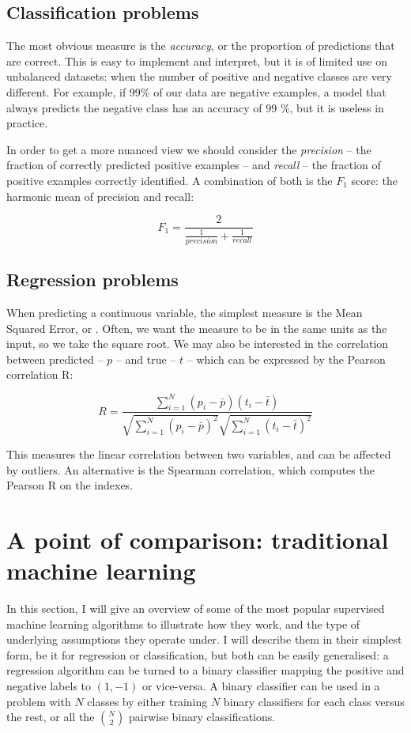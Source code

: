 \subsection{Classification problems}
The most obvious measure is the \emph{accuracy}, or the proportion of predictions that are correct.
This is easy to implement and interpret, but it is of limited use on unbalanced datasets: when the number of positive and negative classes are very different.
For example, if 99\% of our data are negative examples, a model that always predicts the negative class has an accuracy of 99 \%, but it is useless in practice.

In order to get  a more nuanced view we should consider the \emph{precision} -- the fraction of correctly predicted positive examples -- and \emph{recall} -- the fraction of positive examples correctly identified.
A combination  of both is the $F_1$ score: the harmonic mean of precision and recall:

\begin{equation*}
F_1 = \frac{2}{\frac{1}{precision} + \frac{1}{recall}}
\end{equation*}

\subsection{Regression problems}
When predicting a continuous variable, the simplest measure is the Mean Squared Error, or \MSE.
Often, we want the measure to be in the same units as the input, so we take the square root.
We may also be interested in the correlation between predicted -- $p$ -- and true -- $t$ -- which can be  expressed by the Pearson correlation R:

\begin{equation*}
R = \frac{\sum_{i=1}^N (p_i - \bar{p}) (t_i - \bar t)}{\sqrt{\sum_{i=1}^N (p_i - \bar{p})^2} \sqrt{\sum_{i=1}^N(t_i - \bar t)^2}}
\end{equation*}

This measures the linear correlation between two variables, and can be affected by outliers. 
An alternative is the Spearman correlation, which computes the Pearson R on the indexes.

\section[Traditional machine learning]{A point of comparison: traditional machine learning}
In this section, I will give an overview of some of the most popular supervised machine learning algorithms to illustrate how they work, and the type of underlying assumptions they operate under.
I will describe them in their simplest form, be it for regression or classification, but both can be easily generalised: a regression algorithm can be turned to a binary classifier mapping the positive and negative labels to $(1, -1)$ or vice-versa.
A binary classifier can be used in a problem with $N$ classes by either training $N$ binary classifiers for each class versus the rest, or all the $\binom{N}{2}$ pairwise binary classifications.

